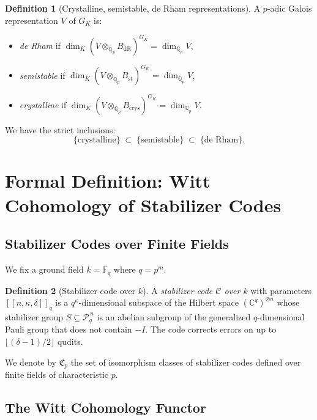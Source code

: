 \documentclass[12pt]{article}
\theoremstyle{definition}
\newtheorem{definition}{Definition}[section]
\theoremstyle{plain}
\theoremstyle{remark}
\newcommand{\Fq}{\mathbb{F}_q}
\newcommand{\Qp}{\mathbb{Q}_p}
\newcommand{\cC}{\mathcal{C}}
\newcommand{\cP}{\mathcal{P}}
\newcommand{\Bcrys}{B_{\mathrm{crys}}}
\newcommand{\Bst}{B_{\mathrm{st}}}
\newcommand{\BdR}{B_{\mathrm{dR}}}
\begin{document}
\begin{definition}[Crystalline, semistable, de Rham representations]
A $p$-adic Galois representation $V$ of $G_K$ is:
\begin{itemize}[nosep]
  \item \emph{de Rham} if $\dim_K(V\otimes_{\Qp}\BdR)^{G_K}=\dim_{\Qp}V$,
  \item \emph{semistable} if $\dim_K(V\otimes_{\Qp}\Bst)^{G_K}=\dim_{\Qp}V$,
  \item \emph{crystalline} if $\dim_K(V\otimes_{\Qp}\Bcrys)^{G_K}=\dim_{\Qp}V$.
\end{itemize}
We have the strict inclusions:
\[
\{\text{crystalline}\}\;\subset\;\{\text{semistable}\}\;\subset\;\{\text{de Rham}\}.
\]
\end{definition}

\section{Formal Definition: Witt Cohomology of Stabilizer Codes}

\subsection{Stabilizer Codes over Finite Fields}

We fix a ground field $k=\Fq$ where $q=p^m$.

\begin{definition}[Stabilizer code over $k$]
A \emph{stabilizer code $\cC$ over $k$} with parameters $[[n,\kappa,\delta]]_q$ is a $q^{\kappa}$-dimensional subspace of the Hilbert space $(\mathbb{C}^q)^{\otimes n}$ whose stabilizer group $S\subseteq\cP_q^{\,n}$ is an abelian subgroup of the generalized $q$-dimensional Pauli group that does not contain $-I$. The code corrects errors on up to $\lfloor(\delta-1)/2\rfloor$ qudits.
\end{definition}

We denote by $\mathfrak{C}_p$ the set of isomorphism classes of stabilizer codes defined over finite fields of characteristic $p$.

\subsection{The Witt Cohomology Functor}
\end{document}
